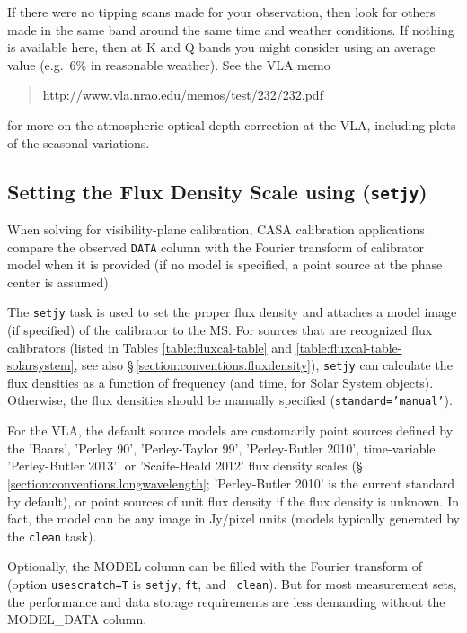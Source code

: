 If there were no tipping scans made for your observation, then look
for others made in the same band around the same time and weather
conditions.  If nothing is available here, then at K and Q bands
you might consider using an average value (e.g.\ 6\% in reasonable
weather).  See the VLA memo
\begin{quote}
   \url{http://www.vla.nrao.edu/memos/test/232/232.pdf}
\end{quote}
for more on the atmospheric optical depth correction at the VLA,
including plots of the seasonal variations.

\subsection{Setting the Flux Density Scale using ({\tt setjy})}
\label{section:cal.prior.models}

When solving for visibility-plane calibration, CASA calibration
applications compare the observed {\tt DATA} column with the Fourier
transform of calibrator model when it is provided (if no model is
specified, a point source at the phase center is assumed).  

The {\tt setjy} task is used to set the proper flux density and
attaches a model image (if specified) of the calibrator to the MS. For
sources that are recognized flux calibrators (listed in Tables
\ref{table:fluxcal-table} and \ref{table:fluxcal-table-solarsystem},
see also \S\,\ref{section:conventions.fluxdensity}),
{\tt setjy} can calculate the flux densities as a function of
frequency (and time, for Solar System objects).  Otherwise, the flux
densities should be manually specified ({\tt standard='manual'}).  

For the VLA, the default source models are customarily point sources
defined by the 'Baars', 'Perley 90', 'Perley-Taylor 99',
'Perley-Butler 2010', time-variable 'Perley-Butler 2013', or 'Scaife-Heald 2012' flux density scales
(\S\,\ref{section:conventions.longwavelength}; 'Perley-Butler 2010' is
the current standard by default), or point sources of unit flux
density if the flux density is unknown. In fact, the model can be any
image in Jy/pixel units (models typically generated by the {\tt clean}
task).


Optionally, the MODEL column can be filled with the Fourier transform
of (option {\tt usescratch=T} is {\tt setjy}, {\tt ft}, and {\tt
  clean}). But for most measurement sets, the performance and data
storage requirements are less demanding without the MODEL\_DATA column.

